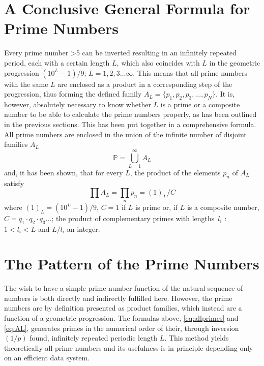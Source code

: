 \documentclass[10pt,twoside,a4paper]{amsart}
\begin{document}
\section{A Conclusive General Formula for Prime Numbers} 

Every prime number {\textgreater}5 can be inverted resulting in an infinitely repeated period, each with a certain length $L$, which also coincides with $L$ in the geometric progression $(10^{L}-1)/9$; $L = 1,2,3\ldots \infty$. This means that all prime numbers with the same $L$ are enclosed as a product in a corresponding step of the progression, thus forming the defined family $A_{L} = \{p_{1},p_{2},p_{3},...,p_{N}\}$. It is, however, absolutely necessary to know whether $L$ is a prime or a composite number to be able to calculate the prime numbers properly, as has been outlined in the previous sections. This has been put together in a comprehensive formula.\\

All prime numbers are enclosed in the union of the infinite number of disjoint families $A_{L}$
\begin{equation}
\label{eq:allprimes}
\mathbb{P}=\bigcup_{L=1}^{\infty}A_{L}
\end{equation}
and, it has been shown, that for every $L$, the product of the elements $p_{n}$ of $A_{L}$ satisfy
\begin{equation}
\label{eq:AL}
\prod A_{L} = \prod_{n}p_{n}=(1)_{L}/C
\end{equation}
where $(1)_{L} = (10^{L}-1)/9$, $C=1$ if $L$ is prime or, if $L$ is a composite number, $C=q_{1}\cdot{}q_{2}\cdot{}q_{3}\ldots$; the product of complementary primes with lengths\  $l_{i}$ : $1<l_{i}<L$ and $L/l_{i}$ an integer. 

\section{The Pattern of the Prime Numbers}
\label{sect:pattern}
The wish to have a simple prime number function of the natural sequence of numbers \cite{Ribenboim} is both directly and indirectly fulfilled here. However, the prime numbers are by definition presented as product families, which instead are a function of a geometric progression. The formulas above, \ref{eq:allprimes} and \ref{eq:AL}, generates primes in the numerical order of their, through inversion $(1/p)$ found, infinitely repeated periodic length $L$. This method yields theoretically all prime numbers and its usefulness is in principle depending only on an efficient data system.\\
\end{document}
